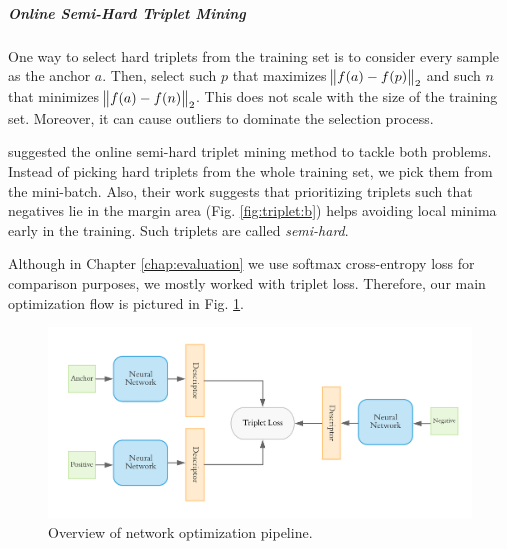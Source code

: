 \subparagraph*{Online Semi-Hard Triplet Mining} One way to select hard triplets from the training set is to consider every sample as the anchor $a$. Then, select such $p$ that maximizes $\norm{f(a) - f(p)}_2$ and such $n$ that minimizes $\norm{f(a) - f(n)}_2$. This does not scale with the size of the training set. Moreover, it can cause outliers to dominate the selection process. 

 suggested the online semi-hard triplet mining method to tackle both problems. Instead of picking hard triplets from the whole training set, we pick them from the mini-batch. Also, their work suggests that prioritizing triplets such that negatives lie in the margin area (Fig. \ref{fig:triplet:b}) helps avoiding local minima early in the training. Such triplets are called \textit{semi-hard}.

Although in Chapter \ref{chap:evaluation} we use softmax cross-entropy loss for comparison purposes, we mostly worked with triplet loss.  Therefore, our main optimization flow is pictured in Fig. \ref{fig:triplet_overall}.

\begin{figure}[hbpt]
	\centering
	\includegraphics[width=\linewidth]{imgs/triplet_loss_architecture.pdf}
	\caption{Overview of network optimization pipeline.}
	\label{fig:triplet_overall}
\end{figure}
